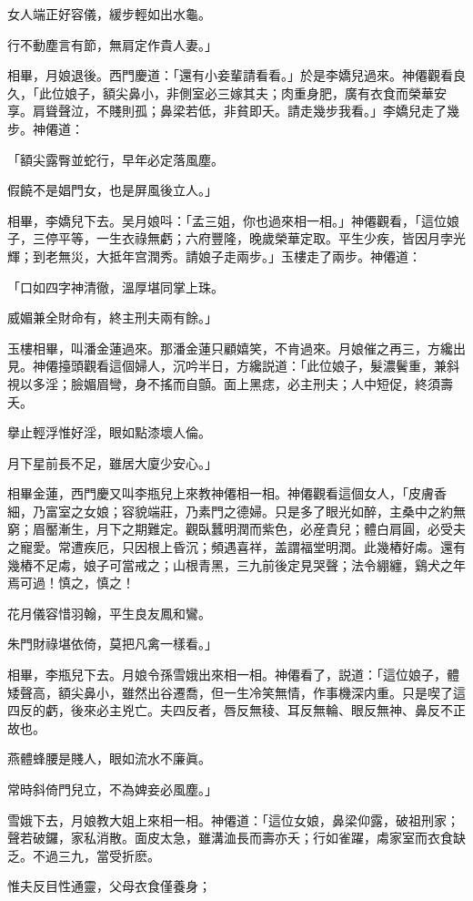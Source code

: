 女人端正好容儀，緩步輕如出水龜。

行不動塵言有節，無肩定作貴人妻。」

相畢，月娘退後。西門慶道：「還有小妾輩請看看。」於是李嬌兒過來。神僊觀看良久，「此位娘子，額尖鼻小，非側室必三嫁其夫；肉重身肥，廣有衣食而榮華安享。肩聳聲泣，不賤則孤；鼻梁若低，非貧即夭。請走幾步我看。」李嬌兒走了幾步。神僊道：

「額尖露臀並蛇行，早年必定落風塵。

假饒不是娼門女，也是屏風後立人。」

相畢，李嬌兒下去。吴月娘呌：「孟三姐，你也過來相一相。」神僊觀看，「這位娘子，三停平等，一生衣祿無虧；六府豐隆，晚歲榮華定取。平生少疾，皆因月孛光輝；到老無災，大抵年宫潤秀。請娘子走兩步。」玉樓走了兩步。神僊道：

「口如四字神清徹，溫厚堪同掌上珠。

威媚兼全財命有，終主刑夫兩有餘。」

玉樓相畢，叫潘金蓮過來。那潘金蓮只顧嬉笑，不肯過來。月娘催之再三，方纔出見。神僊擡頭觀看這個婦人，沉吟半日，方纔説道：「此位娘子，髮濃鬢重，兼斜視以多淫；臉媚眉彎，身不搖而自顫。面上黑痣，必主刑夫；人中短促，終須壽夭。

擧止輕浮惟好淫，眼如點漆壞人倫。

月下星前長不足，雖居大廈少安心。」

相畢金蓮，西門慶又叫李瓶兒上來教神僊相一相。神僊觀看這個女人，「皮膚香細，乃富室之女娘；容貌端莊，乃素門之德婦。只是多了眼光如醉，主桑中之約無窮；眉靨漸生，月下之期難定。觀臥蠶明潤而紫色，必産貴兒；體白肩圓，必受夫之寵愛。常遭疾厄，只因根上昏沉；頻遇喜祥，盖謂福堂明潤。此幾樁好䖏。還有幾樁不足䖏，娘子可當戒之；山根青黑，三九前後定見哭聲；法令綳纏，鷄犬之年焉可過！慎之，慎之！

花月儀容惜羽翰，平生良友鳳和鸞。

朱門財祿堪依倚，莫把凡禽一樣看。」

相畢，李瓶兒下去。月娘令孫雪娥出來相一相。神僊看了，説道：「這位娘子，體矮聲高，額尖鼻小，雖然出谷遷喬，但一生冷笑無情，作事機深内重。只是喫了這四反的虧，後來必主兇亡。夫四反者，唇反無稜、耳反無輪、眼反無神、鼻反不正故也。

燕體蜂腰是賤人，眼如流水不廉眞。

常時斜倚門兒立，不為婢妾必風塵。」

雪娥下去，月娘教大姐上來相一相。神僊道：「這位女娘，鼻梁仰露，破祖刑家；聲若破鑼，家私消散。面皮太急，雖溝洫長而壽亦夭；行如雀躍，䖏家室而衣食缺乏。不過三九，當受折麽。

惟夫反目性通靈，父母衣食僅養身；

